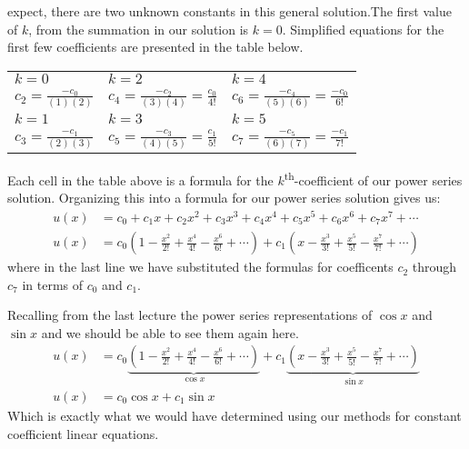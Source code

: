  expect, there are two unknown constants in this general solution.The first value of $k$, from the summation in our solution is $k=0$.  Simplified equations for the first few coefficients are presented in the table below.
\begin{table*}
\begin{tabular}{l | l | l}
$k=0$ & $k=2$ & $k=4$ \\
$c_2=\frac{-c_0}{(1)(2)}$ & $c_4=\frac{-c_2}{(3)(4)}=\frac{c_0}{4!}$ & $c_6 = \frac{-c_4}{(5)(6)} = \frac{-c_0}{6!}$ \\\hline
$k=1$ & $k=3$ & $k=5$ \\
$c_3 = \frac{-c_1}{(2)(3)}$ & $c_5 = \frac{-c_3}{(4)(5)}=\frac{c_1}{5!}$ & $c_7=\frac{-c_5}{(6)(7)} = \frac{-c_1}{7!}$\\
\end{tabular}
\end{table*}
Each cell in the table above is a formula for the $k$\textsuperscript{th}-coefficient of our power series solution.  Organizing this into a formula for our power series solution gives us:
\begin{align*}
u(x) &= c_0 + c_1x + c_2x^2+c_3x^3+c_4x^4+c_5x^5+c_6x^6+c_7x^7 + \cdots \\
u(x)&=c_0\left(1-\frac{x^2}{2!}+\frac{x^4}{4!}-\frac{x^6}{6!} + \cdots  \right) + c_1\left(x -\frac{x^3}{3!}+\frac{x^5}{5!} - \frac{x^7}{7!} + \cdots \right)
\end{align*}
where in the last line we have substituted the formulas for coefficents $c_2$ through $c_7$ in terms of $c_0$ and $c_1$.

Recalling from the last lecture the power series representations of $\cos{x}$ and $\sin{x}$ and we should be able to see them again here.
\begin{align*}
u(x)&=c_0\underbrace{\left(1-\frac{x^2}{2!}+\frac{x^4}{4!}-\frac{x^6}{6!} + \cdots  \right)}_{\cos{x}} + c_1\underbrace{\left(x -\frac{x^3}{3!}+\frac{x^5}{5!} - \frac{x^7}{7!} + \cdots \right)}_{\sin{x}} \\
u(x)&=c_0\cos{x} + c_1\sin{x}
\end{align*}
Which is exactly what we would have determined using our methods for constant coefficient linear equations.

